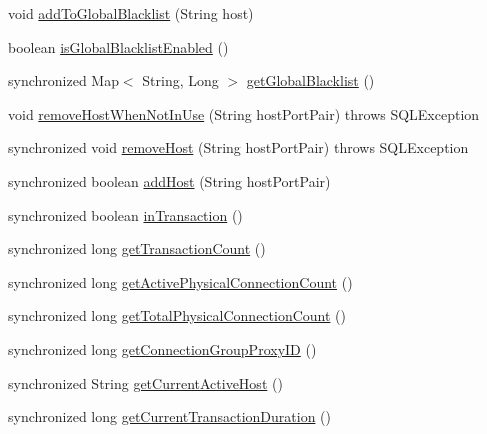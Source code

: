 \begin{DoxyCompactItemize}
\item 
void \mbox{\hyperlink{classcom_1_1mysql_1_1cj_1_1jdbc_1_1ha_1_1_load_balanced_connection_proxy_a27a3da948290bb7ce8ee8e5bac850443}{add\+To\+Global\+Blacklist}} (String host)
\item 
boolean \mbox{\hyperlink{classcom_1_1mysql_1_1cj_1_1jdbc_1_1ha_1_1_load_balanced_connection_proxy_a2051b9a1b9ffc14c9aa4190a61eb5b15}{is\+Global\+Blacklist\+Enabled}} ()
\item 
synchronized Map$<$ String, Long $>$ \mbox{\hyperlink{classcom_1_1mysql_1_1cj_1_1jdbc_1_1ha_1_1_load_balanced_connection_proxy_a166490bbe3865b511ff7df42813a97d8}{get\+Global\+Blacklist}} ()
\item 
void \mbox{\hyperlink{classcom_1_1mysql_1_1cj_1_1jdbc_1_1ha_1_1_load_balanced_connection_proxy_a979d78c2f78920bb885e9eb73c4b37d0}{remove\+Host\+When\+Not\+In\+Use}} (String host\+Port\+Pair)  throws S\+Q\+L\+Exception 
\item 
synchronized void \mbox{\hyperlink{classcom_1_1mysql_1_1cj_1_1jdbc_1_1ha_1_1_load_balanced_connection_proxy_a77e171c52a2cc37e2b2d0f854bf4d050}{remove\+Host}} (String host\+Port\+Pair)  throws S\+Q\+L\+Exception 
\item 
synchronized boolean \mbox{\hyperlink{classcom_1_1mysql_1_1cj_1_1jdbc_1_1ha_1_1_load_balanced_connection_proxy_a02279adacc22183bb7e8c8a4d6e61d5a}{add\+Host}} (String host\+Port\+Pair)
\item 
synchronized boolean \mbox{\hyperlink{classcom_1_1mysql_1_1cj_1_1jdbc_1_1ha_1_1_load_balanced_connection_proxy_aa3b950fc8a61d19e82b3b29660a0f36d}{in\+Transaction}} ()
\item 
synchronized long \mbox{\hyperlink{classcom_1_1mysql_1_1cj_1_1jdbc_1_1ha_1_1_load_balanced_connection_proxy_a529a4a6245e7baac3eb2eb8688597328}{get\+Transaction\+Count}} ()
\item 
synchronized long \mbox{\hyperlink{classcom_1_1mysql_1_1cj_1_1jdbc_1_1ha_1_1_load_balanced_connection_proxy_a12463c009b1bc22d617d2bfa6c531430}{get\+Active\+Physical\+Connection\+Count}} ()
\item 
synchronized long \mbox{\hyperlink{classcom_1_1mysql_1_1cj_1_1jdbc_1_1ha_1_1_load_balanced_connection_proxy_aa02df5b0f92d38804979c7ca65e9ecf0}{get\+Total\+Physical\+Connection\+Count}} ()
\item 
synchronized long \mbox{\hyperlink{classcom_1_1mysql_1_1cj_1_1jdbc_1_1ha_1_1_load_balanced_connection_proxy_a34c97945360e9b266c0f6430797769bd}{get\+Connection\+Group\+Proxy\+ID}} ()
\item 
synchronized String \mbox{\hyperlink{classcom_1_1mysql_1_1cj_1_1jdbc_1_1ha_1_1_load_balanced_connection_proxy_a20e2022c18d8a82ca349b33b46a1f36f}{get\+Current\+Active\+Host}} ()
\item 
synchronized long \mbox{\hyperlink{classcom_1_1mysql_1_1cj_1_1jdbc_1_1ha_1_1_load_balanced_connection_proxy_acfcd1603c08d3641fdbef195539f2e46}{get\+Current\+Transaction\+Duration}} ()
\end{DoxyCompactItemize}
